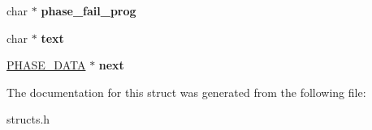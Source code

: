 \begin{DoxyCompactItemize}
\item 
\hypertarget{structphase__data_a389ca93d924bf2963d3f97d46e4cb12f}{char $\ast$ {\bfseries phase\-\_\-fail\-\_\-prog}}\label{structphase__data_a389ca93d924bf2963d3f97d46e4cb12f}

\item 
\hypertarget{structphase__data_a95fc699cc53035ecf0d18adbed5e47b0}{char $\ast$ {\bfseries text}}\label{structphase__data_a95fc699cc53035ecf0d18adbed5e47b0}

\item 
\hypertarget{structphase__data_a92ce59cb45e426c6fd697fe5b0ae1637}{\hyperlink{structphase__data}{P\-H\-A\-S\-E\-\_\-\-D\-A\-T\-A} $\ast$ {\bfseries next}}\label{structphase__data_a92ce59cb45e426c6fd697fe5b0ae1637}

\end{DoxyCompactItemize}


The documentation for this struct was generated from the following file\-:\begin{DoxyCompactItemize}
\item 
structs.\-h\end{DoxyCompactItemize}
